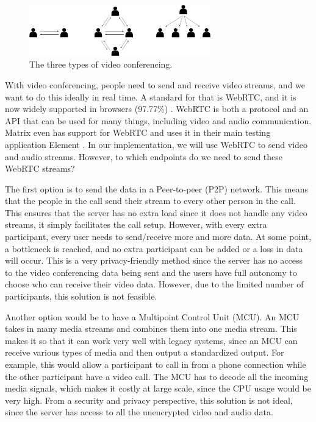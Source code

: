 \documentclass{report}
\begin{document}
\begin{figure}[!hbt]
\centering
\includegraphics[width=0.7\textwidth]{img/three-types}
\caption{The three types of video conferencing.}
\label{fig:three-types-video-conferencing}
\end{figure}

With video conferencing, people need to send and receive video streams, and we want to do this ideally in real time.
A standard for that is WebRTC, and it is now widely supported in browsers (97.77\%) \cite{CIUIWEBRTC}
. WebRTC is both a protocol and an API that can be used for many things, including video and audio communication.
Matrix even has support for WebRTC and uses it in their main testing application Element \cite{ELEMENT}
. In our implementation, we will use WebRTC to send video and audio streams. However, to which endpoints do we need
to send these WebRTC streams?

The first option is to send the data in a Peer-to-peer (P2P) network. This means that the people in the call send
their stream to every other person in the call. This ensures that the server has no extra load since it does not
handle any video streams, it simply facilitates the call setup. However, with every extra participant, every user
needs to send/receive more and more data. At some point, a bottleneck is reached, and no extra participant can be
added or a loss in data will occur. This is a very privacy-friendly method since the server has no access to the
video conferencing data being sent and the users have full autonomy to choose who can receive their video data.
However, due to the limited number of participants, this solution is not feasible.

Another option would be to have a Multipoint Control Unit (MCU). An MCU takes in many media streams and combines
them into one media stream. This makes it so that it can work very well with legacy systems, since an MCU can
receive various types of media and then output a standardized output. For example, this would allow a participant to
call in from a phone connection while the other participant have a video call. The MCU has to decode all the
incoming media signals, which makes it costly at large scale, since the CPU usage would be very high. From a
security and privacy perspective, this solution is not ideal, since the server has access to all the unencrypted
video and audio data.
\end{document}
